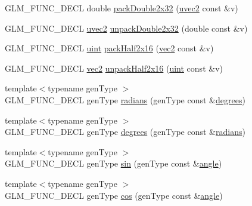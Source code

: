 \begin{DoxyCompactItemize}
\item 
G\-L\-M\-\_\-\-F\-U\-N\-C\-\_\-\-D\-E\-C\-L double \hyperlink{group__core__func__packing_gaf728fdfb98ce34da6f968d9f6bf154d7}{pack\-Double2x32} (\hyperlink{group__core__types_gafd2041b45eff671aa8899d2c2835eee9}{uvec2} const \&v)
\item 
G\-L\-M\-\_\-\-F\-U\-N\-C\-\_\-\-D\-E\-C\-L \hyperlink{group__core__types_gafd2041b45eff671aa8899d2c2835eee9}{uvec2} \hyperlink{group__core__func__packing_ga7e8cf88c278c18969c99af83bceed024}{unpack\-Double2x32} (double const \&v)
\item 
G\-L\-M\-\_\-\-F\-U\-N\-C\-\_\-\-D\-E\-C\-L \hyperlink{group__core__precision_ga4fd29415871152bfb5abd588334147c8}{uint} \hyperlink{group__core__func__packing_ga082f6dd65f73a547ed3067ef00be036f}{pack\-Half2x16} (\hyperlink{group__core__types_gaa1618f51db67eaa145db101d8c8431d8}{vec2} const \&v)
\item 
G\-L\-M\-\_\-\-F\-U\-N\-C\-\_\-\-D\-E\-C\-L \hyperlink{group__core__types_gaa1618f51db67eaa145db101d8c8431d8}{vec2} \hyperlink{group__core__func__packing_ga4051804cc2c930ba4ca73382b79edf1d}{unpack\-Half2x16} (\hyperlink{group__core__precision_ga4fd29415871152bfb5abd588334147c8}{uint} const \&v)
\item 
{\footnotesize template$<$typename gen\-Type $>$ }\\G\-L\-M\-\_\-\-F\-U\-N\-C\-\_\-\-D\-E\-C\-L gen\-Type \hyperlink{group__core__func__trigonometric_ga431d31cdb060059bc5b0696e212f1453}{radians} (gen\-Type const \&\hyperlink{group__core__func__trigonometric_gaf4e5661bd1c993f6090d49e988a4c78a}{degrees})
\item 
{\footnotesize template$<$typename gen\-Type $>$ }\\G\-L\-M\-\_\-\-F\-U\-N\-C\-\_\-\-D\-E\-C\-L gen\-Type \hyperlink{group__core__func__trigonometric_gaf4e5661bd1c993f6090d49e988a4c78a}{degrees} (gen\-Type const \&\hyperlink{group__core__func__trigonometric_ga431d31cdb060059bc5b0696e212f1453}{radians})
\item 
{\footnotesize template$<$typename gen\-Type $>$ }\\G\-L\-M\-\_\-\-F\-U\-N\-C\-\_\-\-D\-E\-C\-L gen\-Type \hyperlink{group__core__func__trigonometric_gafbab21016b7f3bc21afb09a7e42e2df1}{sin} (gen\-Type const \&\hyperlink{group__gtc__quaternion_ga23a3fc7ada5bbb665ff84c92c6e0542c}{angle})
\item 
{\footnotesize template$<$typename gen\-Type $>$ }\\G\-L\-M\-\_\-\-F\-U\-N\-C\-\_\-\-D\-E\-C\-L gen\-Type \hyperlink{group__core__func__trigonometric_gac6708d4f0895dc79b65f50db00840167}{cos} (gen\-Type const \&\hyperlink{group__gtc__quaternion_ga23a3fc7ada5bbb665ff84c92c6e0542c}{angle})

\end{DoxyCompactItemize}
